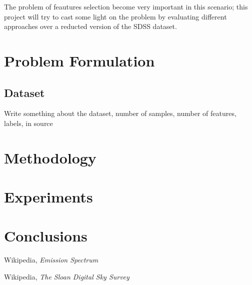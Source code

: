 \documentclass[a4paper,10pt]{article}
\begin{document}
  The problem of feautures selection become very important in this scenario; this project will try to cast
  some light on the problem by evaluating different approaches over a reducted version of the SDSS dataset.
  
\newpage

\section{Problem Formulation}

\subsection{Dataset}
  Write something about the dataset, number of samples, number of features, labels, in source 


\section{Methodology}

\section{Experiments}

\section{Conclusions}

\begin{thebibliography}{9}
    Wikipedia,
    \emph{Emission Spectrum}
    
    Wikipedia,
    \emph{The Sloan Digital Sky Survey}  
\end{thebibliography}
\end{document}

